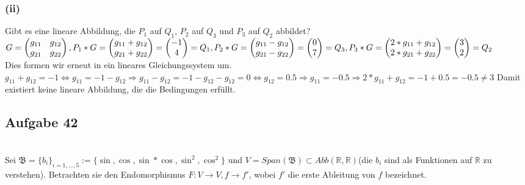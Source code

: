 \documentclass[12pt]{article}
\begin{document}
\subsubsection*{(ii)}Gibt es eine lineare Abbildung, die $P_1$ auf $Q_1$, $P_2$ auf $Q_3$ und $P_3$ auf $Q_2$ abbildet?\\
$G=\begin{pmatrix}
g_{11} & g_{12} \\ g_{21} & g_{22}
\end{pmatrix}, 
P_1 * G = \begin{pmatrix}
g_{11}+g_{12} \\ g_{21}+g_{22}
\end{pmatrix} = 
\begin{pmatrix}
-1 \\ 4
\end{pmatrix} = Q_1,\\
P_2 * G = \begin{pmatrix}
g_{11}-g_{12} \\ g_{21}-g_{22}
\end{pmatrix} = 
\begin{pmatrix}
0 \\ 7
\end{pmatrix} = Q_3, 
P_3 * G = \begin{pmatrix}
2*g_{11}+g_{12} \\ 2*g_{21}+g_{22}
\end{pmatrix} = 
\begin{pmatrix}
3 \\ 2
\end{pmatrix} = Q_2$\\
Dies formen wir erneut in ein lineares Gleichungssystem um.\\
$g_{11}+g_{12}=-1 \Leftrightarrow g_{11}=-1-g_{12} \Rightarrow g_{11}-g_{12} = -1-g_{12}-g_{12}=0 \Leftrightarrow g_{12}=0.5 \Rightarrow g_{11}=-0.5 \Rightarrow 2*g_{11}+g_{12}=-1+0.5 = -0.5 \neq 3$
Damit existiert keine lineare Abbildung, die die Bedingungen erf{\"u}llt.
\subsection*{Aufgabe 42}\hfill\\
Sei $\mathfrak{B}=\{b_i\}_{i=1,...,5}:=\{\sin,\cos,\sin*\cos,\sin^2,\cos^2\}$ und $V = Span(\mathfrak{B})\subset Abb(\mathbb{R},\mathbb{R})$(die $b_i$ sind als Funktionen auf $\mathbb{R}$ zu verstehen). Betrachten sie den Endomorphismus $F: V \rightarrow V, f \rightarrow f'$, wobei $f'$ die erste Ableitung von $f$ bezeichnet.
\end{document}
